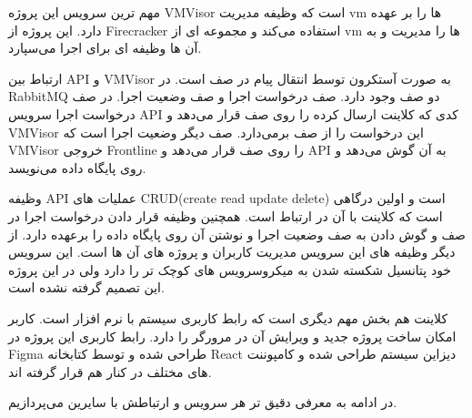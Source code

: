 مهم ترین سرویس این پروژه VMVisor است که وظیفه مدیریت vm ها را بر عهده دارد.
این پروژه از Firecracker استفاده می‌کند و مجموعه ای از vm ها را مدیریت و به آن ها وظیفه ای برای اجرا می‌سپارد.


ارتباط بین API و VMVisor به صورت آستکرون توسط انتقال پیام در صف است.
در RabbitMQ دو صف وجود دارد. صف درخواست اجرا و صف وضعیت اجرا.
در صف درخواست اجرا سرویس API کدی که کلاینت ارسال کرده را روی صف قرار می‌دهد
و VMVisor این درخواست را از صف بر‌می‌دارد.
صف دیگر وضعیت اجرا است که VMVisor خروجی Frontline را روی صف قرار می‌دهد و API به آن گوش می‌دهد و روی پایگاه داده می‌نویسد.

وظیفه API عملیات های CRUD(create read update delete) است و اولین درگاهی است که کلاینت با آن در ارتباط است.
همچنین وظیفه قرار دادن درخواست اجرا در صف و گوش دادن به صف وضعیت اجرا و نوشتن آن روی پایگاه داده را برعهده دارد.
از دیگر وظیفه های این سرویس مدیریت کاربران و پروژه های آن ها است.
این سرویس خود پتانسیل شکسته شدن به میکروسرویس های کوچک تر را دارد ولی در این پروژه این تصمیم گرفته نشده است.

کلاینت هم بخش مهم دیگری است که رابط کاربری سیستم با نرم افزار است. کاربر امکان ساخت پروژه جدید و ویرایش آن در مرورگر را دارد.
رابط کاربری این پروژه در Figma طراحی شده و توسط کتابخانه React دیزاین سیستم طراحی شده و کامپوننت های مختلف در کنار هم قرار گرفته اند.

در ادامه به معرفی دقیق تر هر سرویس و ارتباطش با سایرین می‌پردازیم.